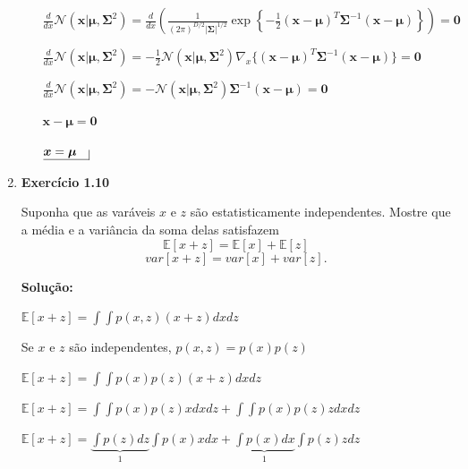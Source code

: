\begin{enumerate}
\begin{itemize}
    $\frac{d}{dx} \mathcal{N}(\boldsymbol{x} | \boldsymbol{\mu}, \boldsymbol{\Sigma}^2) = \frac{d}{dx} \left( \frac{1}{(2\pi)^{D/2}|\boldsymbol{\Sigma}|^{1/2}}\exp\left\{ -\frac{1}{2}(\boldsymbol{x} - \boldsymbol{\mu})^T \boldsymbol{\Sigma}^{-1}(\boldsymbol{x} - \boldsymbol{\mu})  \right\} \right) = \boldsymbol{0}$
    
    $\frac{d}{dx} \mathcal{N}(\boldsymbol{x} | \boldsymbol{\mu}, \boldsymbol{\Sigma}^2) = 
    -\frac{1}{2} \mathcal{N}(\boldsymbol{x} | \boldsymbol{\mu}, \boldsymbol{\Sigma}^2) \nabla_x \{(\boldsymbol{x}-\boldsymbol{\mu})^T \boldsymbol{\Sigma}^{-1} (\boldsymbol{x}-\boldsymbol{\mu})  \}
        = \boldsymbol{0}$
    
    $\frac{d}{dx} \mathcal{N}(\boldsymbol{x} | \boldsymbol{\mu}, \boldsymbol{\Sigma}^2) = 
    -\mathcal{N}(\boldsymbol{x} | \boldsymbol{\mu}, \boldsymbol{\Sigma}^2) \boldsymbol{\Sigma}^{-1} (\boldsymbol{x}-\boldsymbol{\mu})
        = \boldsymbol{0}$

    $\boldsymbol{x}-\boldsymbol{\mu} = \boldsymbol{0}$

    $\underline{\boldsymbol{x}=\boldsymbol{\mu} \quad} \vline$
\end{itemize}

\item \textbf{Exercício 1.10} \par

Suponha que as varáveis $x$ e $z$ são estatisticamente independentes. Mostre que a média e a variância da soma delas satisfazem
\begin{equation*}
    \mathbb{E}[x+z]=\mathbb{E}[x]+\mathbb{E}[z]
\end{equation*}
\begin{equation*}
    var[x+z]=var[x]+var[z].
\end{equation*}
\newline \par
\textbf{Solução:}

$ \mathbb{E}[x+z] = \displaystyle \int \int p(x,z) (x+z) dx dz $

Se $x$ e $z$ são independentes, $p(x,z) = p(x)p(z)$

$ \mathbb{E}[x+z] = \displaystyle \int \int p(x)p(z) (x+z) dx dz $

$ \mathbb{E}[x+z] = \displaystyle \int \int p(x)p(z) x dx dz +  \int \int p(x)p(z) z dx dz $

$ \mathbb{E}[x+z] = \displaystyle \underbrace{  \int p(z) dz}_1  \int p(x) x dx  +  \underbrace{\int p(x) dx}_1 \int p(z) z dz $


\end{enumerate}
